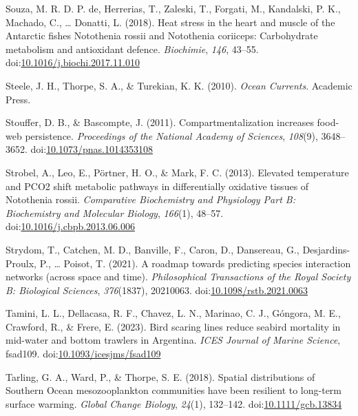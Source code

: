 \documentclass[
]{article}
\newlength{\cslhangindent}
\newlength{\cslentryspacingunit} %
\newenvironment{CSLReferences}[2] %
 {%
  \setlength{\parindent}{0pt}
  \ifodd #1
  \let\oldpar\par
  \def\par{\hangindent=\cslhangindent\oldpar}
  \fi
  \setlength{\parskip}{#2\cslentryspacingunit}
 }%
 {}
\begin{document}
\begin{CSLReferences}{1}{0}
\leavevmode{}%
Souza, M. R. D. P. de, Herrerias, T., Zaleski, T., Forgati, M.,
Kandalski, P. K., Machado, C., \ldots{} Donatti, L. (2018). Heat stress
in the heart and muscle of the {Antarctic} fishes {Notothenia} rossii
and {Notothenia} coriiceps: {Carbohydrate} metabolism and antioxidant
defence. \emph{Biochimie}, \emph{146}, 43--55.
doi:\href{https://doi.org/10.1016/j.biochi.2017.11.010}{10.1016/j.biochi.2017.11.010}

\leavevmode{}%
Steele, J. H., Thorpe, S. A., \& Turekian, K. K. (2010). \emph{Ocean
{Currents}}. {Academic Press}.

\leavevmode{}%
Stouffer, D. B., \& Bascompte, J. (2011). Compartmentalization increases
food-web persistence. \emph{Proceedings of the National Academy of
Sciences}, \emph{108}(9), 3648--3652.
doi:\href{https://doi.org/10.1073/pnas.1014353108}{10.1073/pnas.1014353108}

\leavevmode{}%
Strobel, A., Leo, E., Pörtner, H. O., \& Mark, F. C. (2013). Elevated
temperature and {PCO2} shift metabolic pathways in differentially
oxidative tissues of {Notothenia} rossii. \emph{Comparative Biochemistry
and Physiology Part B: Biochemistry and Molecular Biology},
\emph{166}(1), 48--57.
doi:\href{https://doi.org/10.1016/j.cbpb.2013.06.006}{10.1016/j.cbpb.2013.06.006}

\leavevmode{}%
Strydom, T., Catchen, M. D., Banville, F., Caron, D., Dansereau, G.,
Desjardins-Proulx, P., \ldots{} Poisot, T. (2021). A roadmap towards
predicting species interaction networks (across space and time).
\emph{Philosophical Transactions of the Royal Society B: Biological
Sciences}, \emph{376}(1837), 20210063.
doi:\href{https://doi.org/10.1098/rstb.2021.0063}{10.1098/rstb.2021.0063}

\leavevmode{}%
Tamini, L. L., Dellacasa, R. F., Chavez, L. N., Marinao, C. J., Góngora,
M. E., Crawford, R., \& Frere, E. (2023). Bird scaring lines reduce
seabird mortality in mid-water and bottom trawlers in {Argentina}.
\emph{ICES Journal of Marine Science}, fsad109.
doi:\href{https://doi.org/10.1093/icesjms/fsad109}{10.1093/icesjms/fsad109}

\leavevmode{}%
Tarling, G. A., Ward, P., \& Thorpe, S. E. (2018). Spatial distributions
of {Southern Ocean} mesozooplankton communities have been resilient to
long-term surface warming. \emph{Global Change Biology}, \emph{24}(1),
132--142.
doi:\href{https://doi.org/10.1111/gcb.13834}{10.1111/gcb.13834}


\end{CSLReferences}
\end{document}
